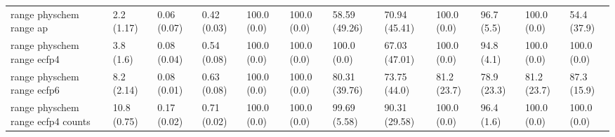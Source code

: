 \begin{tabular}{llllllllllll}
range physchem range ap & {\cellcolor[HTML]{F5FBFC}} \color[HTML]{000000} 2.2 (1.17) & {\cellcolor[HTML]{F7FCFD}} \color[HTML]{000000} 0.06 (0.07) & {\cellcolor[HTML]{88D1BD}} \color[HTML]{000000} 0.42 (0.03) & {\cellcolor[HTML]{00441B}} \color[HTML]{F1F1F1} 100.0 (0.0) & {\cellcolor[HTML]{00441B}} \color[HTML]{F1F1F1} 100.0 (0.0) & {\cellcolor[HTML]{4CB484}} \color[HTML]{F1F1F1} 58.59 (49.26) & {\cellcolor[HTML]{2D9655}} \color[HTML]{F1F1F1} 70.94 (45.41) & {\cellcolor[HTML]{00441B}} \color[HTML]{F1F1F1} 100.0 (0.0) & {\cellcolor[HTML]{004E1F}} \color[HTML]{F1F1F1} 96.7 (5.5) & {\cellcolor[HTML]{00441B}} \color[HTML]{F1F1F1} 100.0 (0.0) & {\cellcolor[HTML]{59BB93}} \color[HTML]{F1F1F1} 54.4 (37.9) \\
range physchem range ecfp4 & {\cellcolor[HTML]{ECF8FA}} \color[HTML]{000000} 3.8 (1.6) & {\cellcolor[HTML]{F6FCFD}} \color[HTML]{000000} 0.08 (0.04) & {\cellcolor[HTML]{59BB93}} \color[HTML]{F1F1F1} 0.54 (0.08) & {\cellcolor[HTML]{00441B}} \color[HTML]{F1F1F1} 100.0 (0.0) & {\cellcolor[HTML]{00441B}} \color[HTML]{F1F1F1} 100.0 (0.0) & {\cellcolor[HTML]{00441B}} \color[HTML]{F1F1F1} 100.0 (0.0) & {\cellcolor[HTML]{36A164}} \color[HTML]{F1F1F1} 67.03 (47.01) & {\cellcolor[HTML]{00441B}} \color[HTML]{F1F1F1} 100.0 (0.0) & {\cellcolor[HTML]{005522}} \color[HTML]{F1F1F1} 94.8 (4.1) & {\cellcolor[HTML]{00441B}} \color[HTML]{F1F1F1} 100.0 (0.0) & {\cellcolor[HTML]{00441B}} \color[HTML]{F1F1F1} 100.0 (0.0) \\
range physchem range ecfp6 & {\cellcolor[HTML]{F5FBFC}} \color[HTML]{000000} 8.2 (2.14) & {\cellcolor[HTML]{F6FCFD}} \color[HTML]{000000} 0.08 (0.01) & {\cellcolor[HTML]{3FAB72}} \color[HTML]{F1F1F1} 0.63 (0.08) & {\cellcolor[HTML]{00441B}} \color[HTML]{F1F1F1} 100.0 (0.0) & {\cellcolor[HTML]{00441B}} \color[HTML]{F1F1F1} 100.0 (0.0) & {\cellcolor[HTML]{147E3A}} \color[HTML]{F1F1F1} 80.31 (39.76) & {\cellcolor[HTML]{268F4A}} \color[HTML]{F1F1F1} 73.75 (44.0) & {\cellcolor[HTML]{117B38}} \color[HTML]{F1F1F1} 81.2 (23.7) & {\cellcolor[HTML]{17813D}} \color[HTML]{F1F1F1} 78.9 (23.3) & {\cellcolor[HTML]{117B38}} \color[HTML]{F1F1F1} 81.2 (23.7) & {\cellcolor[HTML]{006D2C}} \color[HTML]{F1F1F1} 87.3 (15.9) \\
range physchem range ecfp4 counts & {\cellcolor[HTML]{F2FAFC}} \color[HTML]{000000} 10.8 (0.75) & {\cellcolor[HTML]{F7FCFD}} \color[HTML]{000000} 0.17 (0.02) & {\cellcolor[HTML]{2C9553}} \color[HTML]{F1F1F1} 0.71 (0.02) & {\cellcolor[HTML]{00441B}} \color[HTML]{F1F1F1} 100.0 (0.0) & {\cellcolor[HTML]{00441B}} \color[HTML]{F1F1F1} 100.0 (0.0) & {\cellcolor[HTML]{00441B}} \color[HTML]{F1F1F1} 99.69 (5.58) & {\cellcolor[HTML]{006328}} \color[HTML]{F1F1F1} 90.31 (29.58) & {\cellcolor[HTML]{00441B}} \color[HTML]{F1F1F1} 100.0 (0.0) & {\cellcolor[HTML]{005020}} \color[HTML]{F1F1F1} 96.4 (1.6) & {\cellcolor[HTML]{00441B}} \color[HTML]{F1F1F1} 100.0 (0.0) & {\cellcolor[HTML]{00441B}} \color[HTML]{F1F1F1} 100.0 (0.0) \\

\end{tabular}
